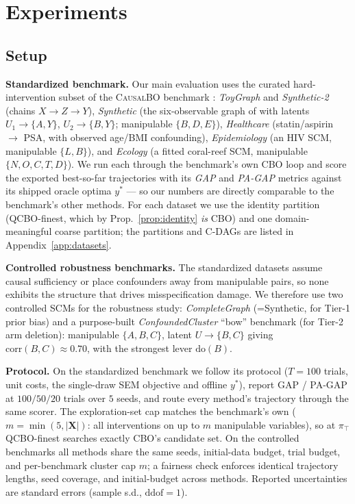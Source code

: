 \documentclass{article}
\renewcommand{\do}{\mathrm{do}}
\newcommand{\QCBO}{\textsc{QCBO}}
\newcommand{\CBO}{\textsc{CBO}}
\begin{document}
\section{Experiments}
\label{sec:experiments}

\subsection{Setup}
\label{sec:exp_setup}

\textbf{Standardized benchmark.} Our main evaluation uses the curated
hard-intervention subset of the \textsc{CausalBO} benchmark
\citep{anonymous2026cbobench}: \emph{ToyGraph} and \emph{Synthetic-2}
(chains $X\!\to\!Z\!\to\!Y$), \emph{Synthetic} (the six-observable graph of
\citealp{aglietti2020causal} with latents $U_1\!\to\!\{A,Y\}$,
$U_2\!\to\!\{B,Y\}$; manipulable $\{B,D,E\}$), \emph{Healthcare} (statin/aspirin
$\to$ PSA, with observed age/BMI confounding), \emph{Epidemiology} (an HIV SCM,
manipulable $\{L,B\}$), and \emph{Ecology} (a fitted coral-reef SCM, manipulable
$\{N,O,C,T,D\}$). We run each through the benchmark's own CBO loop and score the
exported best-so-far trajectories with its \emph{GAP} and \emph{PA-GAP}
metrics against its shipped oracle optima $y^*$ --- so our numbers are directly
comparable to the benchmark's other methods. For each dataset we use the
identity partition (\QCBO{}-finest, which by Prop.~\ref{prop:identity}
\emph{is} \CBO{}) and one domain-meaningful coarse partition; the partitions
and C-DAGs are listed in Appendix~\ref{app:datasets}.

\textbf{Controlled robustness benchmarks.} The standardized datasets assume
causal sufficiency or place confounders away from manipulable pairs, so none
exhibits the structure that drives misspecification damage. We therefore use
two controlled SCMs for the robustness study: \emph{CompleteGraph} (=Synthetic,
for Tier-1 prior bias) and a purpose-built \emph{ConfoundedCluster} ``bow''
benchmark (for Tier-2 arm deletion): manipulable $\{A,B,C\}$, latent
$U\!\to\!\{B,C\}$ giving $\mathrm{corr}(B,C)\!\approx\!0.70$, with the strongest
lever $\do(B)$.

\textbf{Protocol.} On the standardized benchmark we follow its protocol
($T{=}100$ trials, unit costs, the single-draw SEM objective and offline $y^*$),
report GAP / PA-GAP at $100/50/20$ trials over $5$ seeds, and route every
method's trajectory through the same scorer. The exploration-set cap matches
the benchmark's own ($m=\min(5,|\mathbf{X}|)$: all interventions on up to $m$
manipulable variables), so at $\pi_\top$ \QCBO{}-finest searches exactly
\CBO{}'s candidate set. On the controlled benchmarks all
methods share the same seeds, initial-data budget, trial budget, and
per-benchmark cluster cap $m$; a fairness check enforces identical trajectory
lengths, seed coverage, and initial-budget across methods. Reported
uncertainties are standard errors (sample s.d., $\mathrm{ddof}{=}1$).
\end{document}
